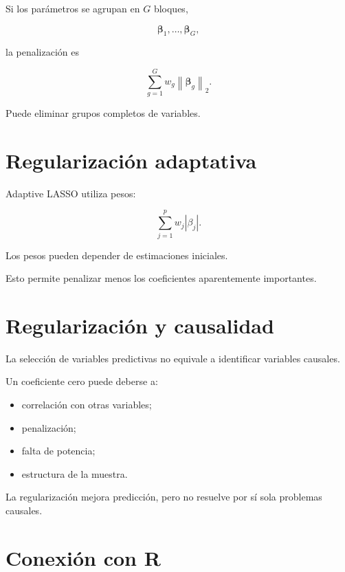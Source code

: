 \documentclass[
  spanish,
  10.5pt,
  letterpaper,
  DIV=11,
  numbers=noendperiod,
  oneside,
  open=any]{scrreprt}
\providecommand{\tightlist}{%
  \setlength{\itemsep}{0pt}\setlength{\parskip}{0pt}}
\theoremstyle{definition}
\theoremstyle{definition}
\theoremstyle{plain}
\theoremstyle{remark}
\begin{document}

Si los parámetros se agrupan en \(G\) bloques,

\[
\boldsymbol{\beta}_1,\ldots,\boldsymbol{\beta}_G,
\]

la penalización es

\[
\sum_{g=1}^{G}
w_g
\left\|
\boldsymbol{\beta}_g
\right\|_2.
\]

Puede eliminar grupos completos de variables.

\section*{Regularización adaptativa}\label{regularizaciuxf3n-adaptativa}


Adaptive LASSO utiliza pesos:

\[
\sum_{j=1}^{p}
w_j|\beta_j|.
\]

Los pesos pueden depender de estimaciones iniciales.

Esto permite penalizar menos los coeficientes aparentemente importantes.

\section*{Regularización y
causalidad}\label{regularizaciuxf3n-y-causalidad}


La selección de variables predictivas no equivale a identificar
variables causales.

Un coeficiente cero puede deberse a:

\begin{itemize}
\tightlist
\item
  correlación con otras variables;
\item
  penalización;
\item
  falta de potencia;
\item
  estructura de la muestra.
\end{itemize}

La regularización mejora predicción, pero no resuelve por sí sola
problemas causales.

\section*{Conexión con R}\label{conexiuxf3n-con-r-7}
\end{document}
